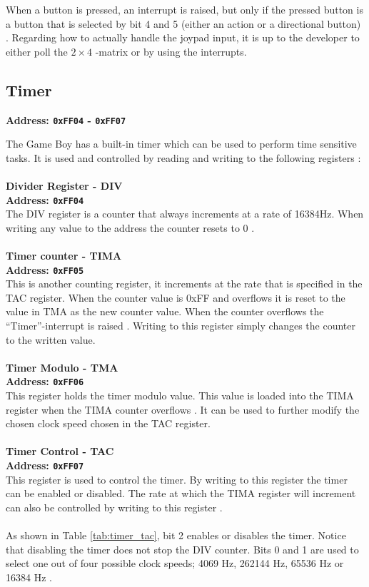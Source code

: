 When a button is pressed, an interrupt is raised, but only if the pressed button is a button that is selected by bit 4 and 5 (either an action or a directional button) \cite{pandocsjoypad}. Regarding how to actually handle the joypad input, it is up to the developer to either poll the $2 \times 4$ -matrix or by using the interrupts.

\subsection{Timer}
\label{sec:Timer}

\textbf{Address: \texttt{0xFF04} - \texttt{0xFF07}}

The Game Boy has a built-in timer which can be used to perform time sensitive tasks. 
It is used and controlled by reading and writing to the following registers \cite{pandocstimer}:
\\\\
\textbf{Divider Register - DIV}
\\
\textbf{Address: \texttt{0xFF04}}
\\
The DIV register is a counter that always increments at a rate of 16384Hz. 
When writing any value to the address the counter resets to 0 \cite{pandocstimer}.
\\\\
\newpage
\textbf{Timer counter - TIMA}
\\
\textbf{Address: \texttt{0xFF05}}
\\
This is another counting register, it increments at the rate that is specified in the TAC register. 
When the counter value is 0xFF and overflows it is reset to the value in TMA as the new counter value.
When the counter overflows the ``Timer''-interrupt is raised \cite{pandocstimer}.
Writing to this register simply changes the counter to the written value.
\\\\
\textbf{Timer Modulo - TMA}
\\
\textbf{Address: \texttt{0xFF06}}
\\
This register holds the timer modulo value.
This value is loaded into the TIMA register when the TIMA counter overflows \cite{pandocstimer}.
It can be used to further modify the chosen clock speed chosen in the TAC register.
\\\\
\textbf{Timer Control - TAC}
\\
\textbf{Address: \texttt{0xFF07}}
\\
This register is used to control the timer.
By writing to this register the timer can be enabled or disabled. The rate at which the TIMA register will increment can also be controlled by writing to this register \cite{pandocstimer}. 
\\\\
As shown in Table \ref{tab:timer_tac}, bit 2 enables or disables the timer. 
Notice that disabling the timer does not stop the DIV counter.
Bits 0 and 1 are used to select one out of four possible clock speeds; 4069 Hz, 262144 Hz, 65536 Hz or 16384 Hz \cite{pandocstimer}. 

